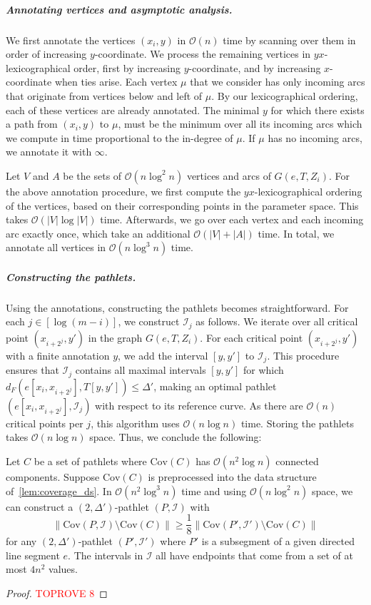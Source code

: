 \documentclass[a4paper,UKenglish,cleveref,thm-restate,notab]{lipics-v2021}
\newcommand{\dF}{\ensuremath{d_F}}
\newcommand{\bigO}{\mathcal{O}}
\newcommand{\I}{\mathcal{I}}
\newcommand{\Cov}{\ensuremath{\mathrm{Cov}}}
\begin{document}
\subparagraph*{Annotating vertices and asymptotic analysis.}
    We first annotate the vertices $(x_i, y)$ in $\bigO(n)$ time by scanning over them in order of increasing $y$-coordinate.
    We process the remaining vertices in $yx$-lexicographical order, first by increasing $y$-coordinate, and  by increasing $x$-coordinate when ties arise.
    Each vertex $\mu$ that we consider has only incoming arcs that originate from vertices below and left of $\mu$.
    By our lexicographical ordering, each of these vertices are already annotated. 
    The minimal $y$ for which there exists a path from $(x_i, y)$ to $\mu$, must be the minimum over all its incoming arcs which we compute in time proportional to the in-degree of $\mu$. 
    If $\mu$ has no incoming arcs, we annotate it with $\infty$. 
    
    Let $V$ and $A$ be the sets of $\bigO(n \log^2 n)$ vertices and arcs of $G(e, T, Z_i)$.
    For the above annotation procedure, we first compute the $yx$-lexicographical ordering of the vertices, based on their corresponding points in the parameter space.
    This takes $\bigO(|V| \log |V|)$ time.
    Afterwards, we go over each vertex and each incoming arc exactly once, which take an additional $\bigO(|V| + |A|)$ time.
    In total, we annotate all vertices in $\bigO(n \log^3 n)$ time.

\subparagraph*{Constructing the pathlets.}
    Using the annotations, constructing the pathlets becomes straightforward.
    For each $j \in [\log (m-i)]$, we construct $\I_j$ as follows.
    We iterate over all critical point $(x_{i+2^j}, y')$ in the graph $G(e, T, Z_i)$. 
    For each critical point $(x_{i+2^j}, y')$ with a finite annotation $y$, we add the interval $[y, y']$ to $\I_j$.
    This procedure ensures that $\I_j$ contains all maximal intervals $[y, y']$ for which $\dF(e[x_i, x_{i+2^j}], T[y, y']) \leq \Delta'$, making an optimal pathlet $(e[x_i, x_{i+2^j}], \I_j)$ with respect to its reference curve.
    As there are $\bigO(n)$ critical points per $j$, this algorithm uses $\bigO(n \log n)$ time.
    Storing the pathlets takes $\bigO(n \log n)$ space.
    Thus, we conclude the following:

    \begin{lemma}
        Let $C$ be a set of pathlets where $\Cov(C)$ has $\bigO(n^2 \log n)$ connected components.
        Suppose $\Cov(C)$ is preprocessed into the data structure of~\cref{lem:coverage_ds}.
        In $\bigO(n^2 \log^3 n)$ time and using $\bigO(n \log^2 n)$ space, we can construct a $(2, \Delta')$-pathlet $(P, \I)$ with
        \[
            \lVert \Cov(P, \I) \setminus \Cov(C) \rVert \geq \frac{1}{8} \lVert \Cov(P', \I') \setminus \Cov(C) \rVert
        \]
        for any $(2, \Delta')$-pathlet $(P', \I')$ where $P'$ is a subsegment of a given directed line segment $e$.
        The intervals in $\I$ all have endpoints that come from a set of at most $4n^2$ values.
    \end{lemma}
    \begin{proof}\textcolor{red}{TOPROVE 8}\end{proof}
    
\end{document}
